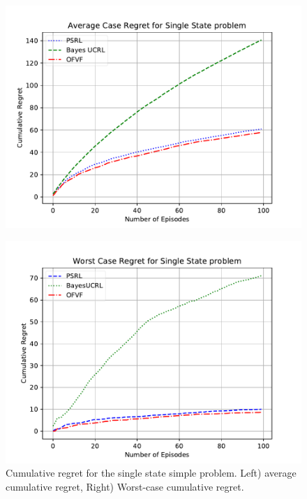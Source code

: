 \documentclass{article}
\theoremstyle{plain}
\theoremstyle{definition}
\begin{document}
\begin{figure}
	\centering
	\begin{minipage}[c]{.85\columnwidth}
		\centering
		\includegraphics[width=\linewidth]{fig/SingleState_averagecase_Bayes_PSRL_OFVF.pdf}\\
	\end{minipage}%
	\begin{minipage}[c]{.85\columnwidth}
		\centering
		\includegraphics[width=\linewidth]{fig/SingleState_worstcase_Bayes_PSRL_OFVF.pdf}
	\end{minipage}%
	\caption{Cumulative regret for the single state simple problem. Left) average cumulative regret, Right) Worst-case cumulative regret.}
	\label{fig:single_state}
\end{figure}
\end{document}
